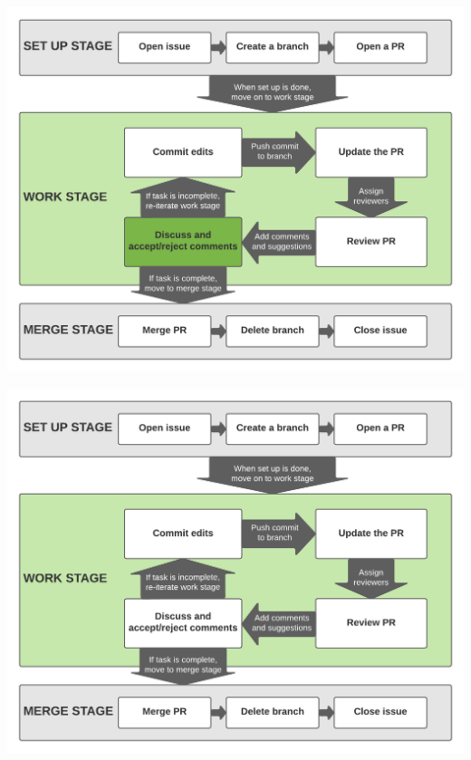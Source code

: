 \documentclass[aspectratio=169]{beamer} %
\begin{document}
\begin{frame}
	\includegraphics[width=\textwidth]{./img/branch-pr-merge-cycle-S2-4.png}
\end{frame}

\begin{frame}
	\includegraphics[width=\textwidth]{./img/branch-pr-merge-cycle-S2.png}
\end{frame}
\end{document}
